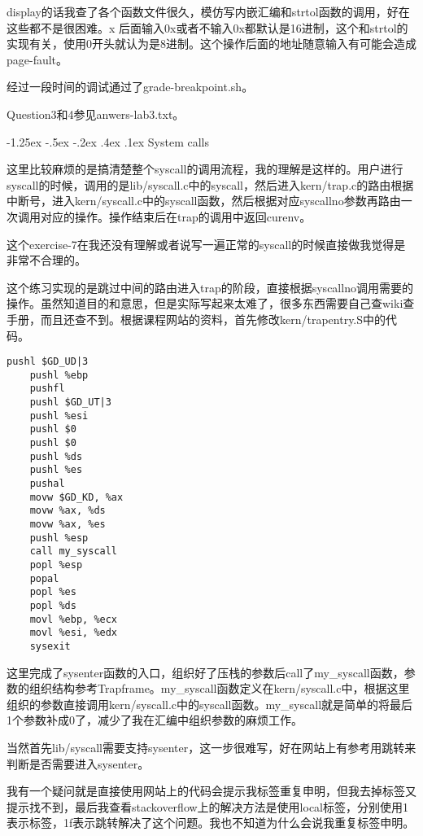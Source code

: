 \documentclass[11pt,a4paper]{article}
\makeatletter
\newcommand{\sihao}{\fontsize{14pt}{\baselineskip}\selectfont}
\renewcommand\subsection{\@startsection{subsection}{1}{\z@}%
{-1.25ex \@plus -.5ex \@minus -.2ex}%
{.4ex \@plus .1ex}%
{\normalfont\sihao\fontspec{黑体}}}
\makeatother
\begin{document}
display的话我查了各个函数文件很久，模仿写内嵌汇编和strtol函数的调用，好在这些都不是很困难。x 后面输入0x或者不输入0x都默认是16进制，这个和strtol的实现有关，使用0开头就认为是8进制。这个操作后面的地址随意输入有可能会造成page-fault。

经过一段时间的调试通过了grade-breakpoint.sh。

Question3和4参见anwers-lab3.txt。

\subsection{System calls}

这里比较麻烦的是搞清楚整个syscall的调用流程，我的理解是这样的。用户进行syscall的时候，调用的是lib/syscall.c中的syscall，然后进入kern/trap.c的路由根据中断号，进入kern/syscall.c中的syscall函数，然后根据对应syscallno参数再路由一次调用对应的操作。操作结束后在trap的调用中返回curenv。

这个exercise-7在我还没有理解或者说写一遍正常的syscall的时候直接做我觉得是非常不合理的。

这个练习实现的是跳过中间的路由进入trap的阶段，直接根据syscallno调用需要的操作。虽然知道目的和意思，但是实际写起来太难了，很多东西需要自己查wiki查手册，而且还查不到。根据课程网站的资料，首先修改kern/trapentry.S中的代码。

\setmainfont{Consolas}
\begin{lstlisting}[language={[x86masm]Assembler},firstnumber=1,title=kern/trapentry.c] 
	pushl $GD_UD|3
	pushl %ebp
	pushfl
	pushl $GD_UT|3
	pushl %esi
	pushl $0
	pushl $0
	pushl %ds
	pushl %es
	pushal
	movw $GD_KD, %ax
	movw %ax, %ds
	movw %ax, %es
	pushl %esp
	call my_syscall
	popl %esp
	popal
	popl %es
	popl %ds
	movl %ebp, %ecx
	movl %esi, %edx
	sysexit
\end{lstlisting}
\setmainfont[BoldFont=黑体]{宋体}

这里完成了sysenter函数的入口，组织好了压栈的参数后call了my\_syscall函数，参数的组织结构参考Trapframe。my\_syscall函数定义在kern/syscall.c中，根据这里组织的参数直接调用kern/syscall.c中的syscall函数。my\_syscall就是简单的将最后1个参数补成0了，减少了我在汇编中组织参数的麻烦工作。

当然首先lib/syscall需要支持sysenter，这一步很难写，好在网站上有参考用跳转来判断是否需要进入sysenter。

我有一个疑问就是直接使用网站上的代码会提示我标签重复申明，但我去掉标签又提示找不到，最后我查看stackoverflow上的解决方法是使用local标签，分别使用1表示标签，1f表示跳转解决了这个问题。我也不知道为什么会说我重复标签申明。
\end{document}

